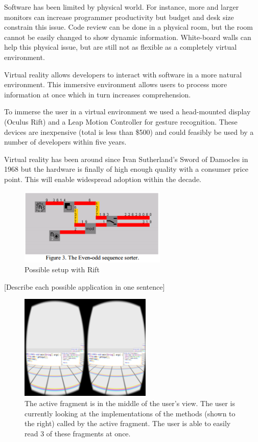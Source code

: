 \documentclass{acm_proc_article-sp}
\begin{document}
Software has been limited by physical world. For instance, more and larger monitors can increase programmer productivity but budget and desk size constrain this issue.
Code review can be done in a physical room, but the room cannot be easily changed to show dynamic information. White-board walls can help this physical issue, but are still not as flexible as a completely virtual environment.

Virtual reality allows developers to interact with software in a more natural environment. This immersive environment allows users to process more information at once which in turn increases comprehension.

To immerse the user in a virtual environment we used a head-mounted display (Oculus Rift) and a Leap Motion Controller for gesture recognition. These devices are inexpensive (total is less than \$500) and could feasibly be used by a number of developers within five years.

Virtual reality has been around since Ivan Sutherland's Sword of Damocles in 1968 but the hardware is finally of high enough quality with a consumer price point. This will enable widespread adoption within the decade.

\begin{figure}[ht!]
\centering
\includegraphics[width=70mm]{figures/EvenOdd}
\caption{Possible setup with Rift \label{overflow}}
\end{figure}

[Describe each possible application in one sentence]

\begin{figure}[ht]
\centering
\includegraphics[width=\textwidth,height=5cm]{figures/stack}
\caption{The active fragment is in the middle of the user's view. The user is currently looking at the implementations of the methods (shown to the right) called by the active fragment. The user is able to easily read 3 of these fragments at once.  \label{immersion}}
\end{figure}
\end{document}
